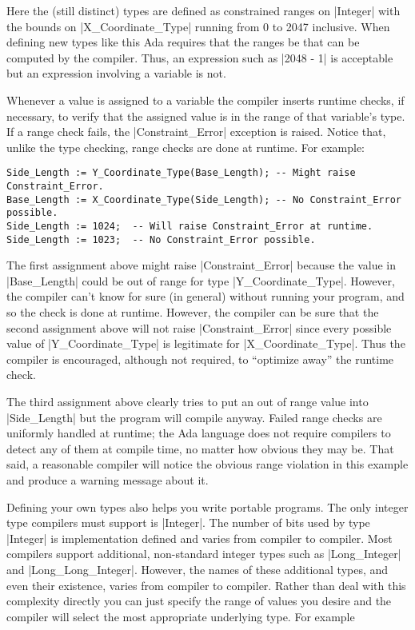 Here the (still distinct) types are defined as constrained ranges on |Integer| with the bounds
on |X_Coordinate_Type| running from 0 to 2047 inclusive. When defining new types like this Ada
requires that the ranges be  that can be computed by the compiler.
Thus, an expression such as |2048 - 1| is acceptable but an expression involving a variable is
not.

Whenever a value is assigned to a variable the compiler inserts runtime checks, if necessary, to
verify that the assigned value is in the range of that variable's type. If a range check fails,
the |Constraint_Error| exception is raised. Notice that, unlike the type checking, range checks
are done at runtime. For example:

\begin{lstlisting}
Side_Length := Y_Coordinate_Type(Base_Length); -- Might raise Constraint_Error.
Base_Length := X_Coordinate_Type(Side_Length); -- No Constraint_Error possible.
Side_Length := 1024;  -- Will raise Constraint_Error at runtime.
Side_Length := 1023;  -- No Constraint_Error possible.
\end{lstlisting}

The first assignment above might raise |Constraint_Error| because the value in |Base_Length|
could be out of range for type |Y_Coordinate_Type|. However, the compiler can't know for sure
(in general) without running your program, and so the check is done at runtime. However, the
compiler can be sure that the second assignment above will not raise |Constraint_Error| since
every possible value of |Y_Coordinate_Type| is legitimate for |X_Coordinate_Type|. Thus the
compiler is encouraged, although not required, to ``optimize away'' the runtime check.

The third assignment above clearly tries to put an out of range value into |Side_Length| but the
program will compile anyway. Failed range checks are uniformly handled at runtime; the Ada
language does not require compilers to detect any of them at compile time, no matter how obvious
they may be. That said, a reasonable compiler will notice the obvious range violation in this
example and produce a warning message about it.

Defining your own types also helps you write portable programs. The only integer type compilers
must support is |Integer|. The number of bits used by type |Integer| is implementation defined
and varies from compiler to compiler. Most compilers support additional, non-standard integer
types such as |Long_Integer| and |Long_Long_Integer|. However, the names of these additional
types, and even their existence, varies from compiler to compiler. Rather than deal with this
complexity directly you can just specify the range of values you desire and the compiler will
select the most appropriate underlying type. For example

